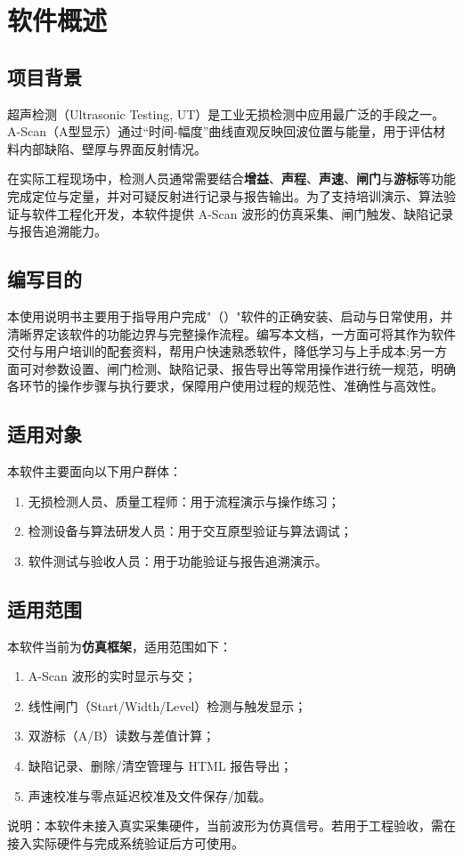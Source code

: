 %
%
\section{软件概述}

\subsection{项目背景}
\par
超声检测（Ultrasonic Testing, UT）是工业无损检测中应用最广泛的手段之一。A-Scan（A型显示）通过“时间-幅度”曲线直观反映回波位置与能量，用于评估材料内部缺陷、壁厚与界面反射情况。
\par
在实际工程现场中，检测人员通常需要结合\textbf{增益}、\textbf{声程}、\textbf{声速}、\textbf{闸门}与\textbf{游标}等功能完成定位与定量，并对可疑反射进行记录与报告输出。为了支持培训演示、算法验证与软件工程化开发，本软件提供 A-Scan 波形的仿真采集、闸门触发、缺陷记录与报告追溯能力。

\subsection{编写目的}
\par
本使用说明书主要用于指导用户完成"\SoftwareName（\Version）"软件的正确安装、启动与日常使用，并清晰界定该软件的功能边界与完整操作流程。编写本文档，一方面可将其作为软件交付与用户培训的配套资料，帮用户快速熟悉软件，降低学习与上手成本;另一方面可对参数设置、闸门检测、缺陷记录、报告导出等常用操作进行统一规范，明确各环节的操作步骤与执行要求，保障用户使用过程的规范性、准确性与高效性。


\subsection{适用对象}
\par
本软件主要面向以下用户群体：
\begin{enumerate}
	\item 无损检测人员、质量工程师：用于流程演示与操作练习；
	\item 检测设备与算法研发人员：用于交互原型验证与算法调试；
	\item 软件测试与验收人员：用于功能验证与报告追溯演示。
\end{enumerate}

\subsection{适用范围}
\par
本软件当前为\textbf{仿真框架}，适用范围如下：
\begin{enumerate}
	\item A-Scan 波形的实时显示与交；
	\item 线性闸门（Start/Width/Level）检测与触发显示；
	\item 双游标（A/B）读数与差值计算；
	\item 缺陷记录、删除/清空管理与 HTML 报告导出；
	\item 声速校准与零点延迟校准及文件保存/加载。
\end{enumerate}
\par
说明：本软件未接入真实采集硬件，当前波形为仿真信号。若用于工程验收，需在接入实际硬件与完成系统验证后方可使用。

